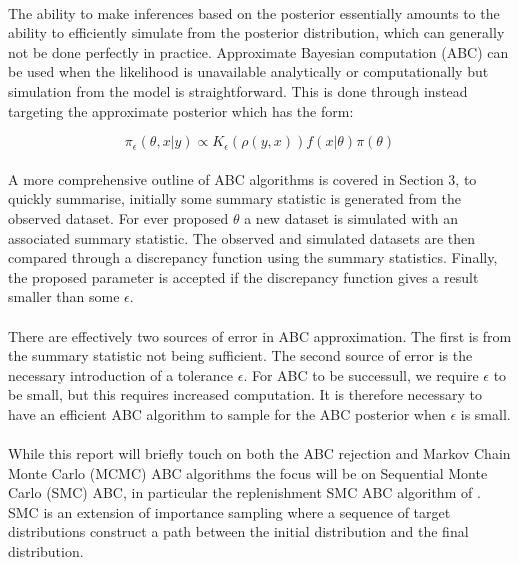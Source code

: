 \documentclass[12,fleqn]{article}
\theoremstyle{definition}
\theoremstyle{plain}
\begin{document}
\paragraph{}
 The ability to make inferences based on the posterior essentially amounts to the ability to efficiently simulate from the posterior distribution, which can generally not be done perfectly in practice. Approximate Bayesian computation (ABC) can be used when the likelihood is unavailable analytically or computationally but simulation from the model is straightforward. This is done through instead targeting the approximate posterior which has the form:
\par

\begin{equation*}
\pi_\epsilon(\theta, x|y) \propto K_\epsilon (\rho(y,x))f(x|\theta)\pi(\theta)
\end{equation*}

\paragraph{}
A more comprehensive outline of ABC algorithms is covered in Section 3, to quickly summarise, initially some summary statistic is generated from the observed dataset. For ever proposed $\theta$ a new dataset is simulated with an associated summary statistic. The observed and simulated datasets are then compared through a discrepancy function using the summary statistics. Finally, the proposed parameter is accepted if the discrepancy function gives a result smaller than some $\epsilon$.
\par
\paragraph{}
There are effectively two sources of error in ABC approximation. The first is from the summary statistic not being sufficient. The second source of error is the necessary introduction of a tolerance $\epsilon$. For ABC to be successull, we require $\epsilon$ to be small, but this requires increased computation. It is therefore necessary to have an efficient ABC algorithm to sample for the ABC posterior when $\epsilon$ is small.
\par

\paragraph{}
While this report will briefly touch on both the ABC rejection and Markov Chain Monte Carlo (MCMC) ABC algorithms the focus will be on Sequential Monte Carlo (SMC) ABC,  in particular the replenishment SMC ABC algorithm of . SMC is an extension of importance sampling where a sequence of target distributions construct a path between the initial distribution and the final distribution.
\par
\end{document}
